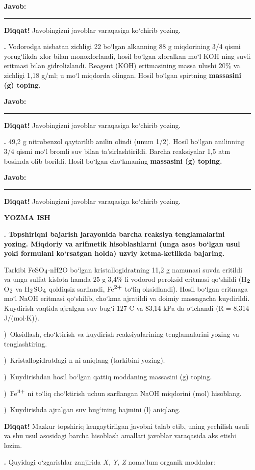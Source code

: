 \documentclass[11pt,a4paper]{article}
\renewcommand{\textsubscript}[1]{\ensuremath{_{\text{\fontsize{8}{8}\selectfont #1}}}}
\renewcommand{\textsuperscript}[1]{\ensuremath{^{\text{\fontsize{8}{8}\selectfont #1}}}}
\newcommand{\qn}[1]{\textbf{\fontsize{11.5}{13}\selectfont #1}}
\newcommand{\qsep}{\par\vspace{13pt}}
\newcommand{\diqqat}[1]{\par\smallskip\noindent\textbf{Diqqat!} #1\par\medskip}
\newcommand{\javob}{\par\nopagebreak[4]\smallskip\noindent\textbf{Javob:} \rule[-2pt]{7.5cm}{0.4pt}\par\smallskip\noindent\textbf{Diqqat!} Javobingizni javoblar varaqasiga ko`chirib yozing.\par\medskip}
\begin{document}
\javob\qsep
\noindent\qn{39.} Vodorodga nisbatan zichligi 22 bo`lgan alkanning 88 g miqdorining 3/4 qismi yorug`likda xlor bilan monoxlorlandi, hosil bo`lgan xloralkan mo`l KOH ning suvli eritmasi bilan gidrolizlandi. Reagent (KOH) eritmasining massa ulushi 20\% va zichligi 1,18 g/ml; u mo`l miqdorda olingan. Hosil bo`lgan spirtning \textbf{massasini (g) toping.}
\javob\qsep
\noindent\qn{40.} 49,2 g nitrobenzol qaytarilib anilin olindi (unum 1/2). Hosil bo`lgan anilinning 3/4 qismi mo`l bromli suv bilan ta'sirlashtirildi. Barcha reaksiyalar 1,5 atm bosimda olib borildi. Hosil bo`lgan cho`kmaning \textbf{massasini (g) toping.}
\javob\qsep
\par\bigskip\begin{center}\textbf{\fontsize{13}{15}\selectfont YOZMA ISH}\end{center}
\noindent\qn{41.} \textbf{Topshiriqni bajarish jarayonida barcha reaksiya tenglamalarini yozing. Miqdoriy va arifmetik hisoblashlarni (unga asos bo`lgan usul yoki formulani ko`rsatgan holda) uzviy ketma-ketlikda bajaring.}\par\smallskip
Tarkibi FeSO\textsubscript{4}$\cdot$nH2O bo`lgan kristallogidratning 11,2 g namunasi suvda eritildi va unga sulfat kislota hamda 25 g 3,4\% li vodorod peroksid eritmasi qo`shildi (H\textsubscript{2}O\textsubscript{2} va H\textsubscript{2}SO\textsubscript{4} qoldiqsiz sarflandi, Fe\textsuperscript{2+} to`liq oksidlandi). Hosil bo`lgan eritmaga mo`l NaOH eritmasi qo`shilib, cho`kma ajratildi va doimiy massagacha kuydirildi. Kuydirish vaqtida ajralgan suv bug`i 127 \textdegree{}C va 83,14 kPa da o`lchandi (R = 8,314 J/(mol$\cdot$K)).\par
{})\ Oksidlash, cho`ktirish va kuydirish reaksiyalarining tenglamalarini yozing va tenglashtiring.\par
{})\ Kristallogidratdagi n ni aniqlang (tarkibini yozing).\par
{})\ Kuydirishdan hosil bo`lgan qattiq moddaning massasini (g) toping.\par
{})\ Fe\textsuperscript{3+} ni to`liq cho`ktirish uchun sarflangan NaOH miqdorini (mol) hisoblang.\par
{})\ Kuydirishda ajralgan suv bug`ining hajmini (l) aniqlang.\par
\diqqat{Mazkur topshiriq kengaytirilgan javobni talab etib, uning yechilish usuli va shu usul asosidagi barcha hisoblash amallari javoblar varaqasida aks etishi lozim.}\qsep
\noindent\qn{42.} Quyidagi o`zgarishlar zanjirida \textit{X}, \textit{Y}, \textit{Z} noma'lum organik moddalar:\par
\end{document}
